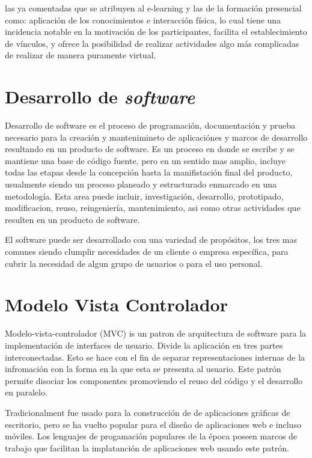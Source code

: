 las ya comentadas que se atribuyen al e-learning y las de la formación presencial como: aplicación de los conocimientos e interacción física, lo cual tiene una incidencia notable en la motivación de los participantes, facilita el establecimiento de vínculos, y ofrece la posibilidad de realizar actividades algo más complicadas de realizar de manera puramente virtual.

\section{Desarrollo de \emph{software}}

Desarrollo de software es el proceso de programación, documentación y prueba necesario para la creación y mantenimineto de aplicaciónes y marcos de desarrollo resultando en un producto de software. Es un proceso en donde se escribe y se mantiene una base de código fuente, pero en un sentido mas amplio, incluye todas las etapas desde la concepción hasta la manifistación final del producto, usualmente siendo un proceso planeado y estructurado enmarcado en una metodología. Esta area puede incluir, investigación, desarrollo, prototipado, modificacion, reuso, reingeniería, mantenimiento, asi como otras actividades que resulten en un producto de software.

El software puede ser desarrollado con una variedad de propósitos, los tres mas comunes siendo clumplir necesidades de un cliente o empresa específica, para cubrir la necesidad de algun grupo de usuarios o para el uso personal.

\section{Modelo Vista Controlador}

Modelo-vista-controlador (MVC) is un patron de arquitectura de software para la implementación de interfaces de usuario. Divide la aplicación en tres partes interconectadas. Esto se hace con el fin de separar representaciones internas de la infromación con la forma en la que esta se presenta al usuario. Este patrón permite disociar los componentes promoviendo el reuso del código y el desarrollo en paralelo.

Tradicionalment fue usado para la construcción de de aplicaciones gráficas de escritorio, pero se ha vuelto popular para el diseño de aplicaciones web e incluso móviles. Los lenguajes de progamación populares de la época poseen marcos de trabajo que facilitan la implatanción de aplicaciones web usando este patrón.

